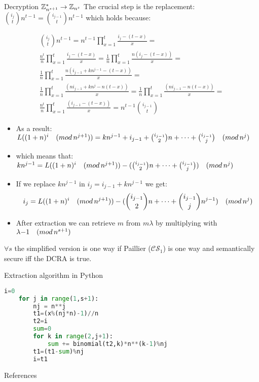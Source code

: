 \documentclass{beamer}
\begin{document}
\begin{frame}[allowframebreaks]{Decryption $\mathbb{Z}_{n^{s+1}}^* \rightarrow \mathbb{Z}_{n^s}$}
The crucial step is the replacement: ${i_j \choose t} n^{t-1} = {i_{j-1} \choose t} n^{t-1}$ which holds because:

\framebreak

\begin{align*}
{i_j \choose t} n^{t-1} = n^{t-1} \prod_{x=1}^{t} \frac{i_j-(t-x)}{x} = \\
\frac{n^t}{n} \prod_{x=1}^{t} \frac{i_j-(t-x)}{x} = \frac{1}{n} \prod_{x=1}^{t} \frac{n(i_j-(t-x))}{x} = \\
\frac{1}{n} \prod_{x=1}^{t} \frac{n(i_{j-1}+kn^{j-1}-(t-x))}{x} = \\
\frac{1}{n} \prod_{x=1}^{t} \frac{(ni_{j-1}+kn^{j}-n(t-x))}{x} = \frac{1}{n} \prod_{x=1}^{t} \frac{(ni_{j-1}-n(t-x))}{x} =\\
\frac{n^t}{n} \prod_{x=1}^{t} \frac{(i_{j-1}-(t-x))}{x} = n^{t-1} {i_{j-1} \choose t}
\end{align*}

\framebreak

\begin{itemize}
\item As a result: $L((1+n)^{i} \quad (mod \, {n^{j+1}})) =   kn^{j-1} + i_{j-1} + { i_{j-1} \choose 2}n + \cdots + { i_{j-1} \choose {j}} \quad (mod \, {n^j}) $ 
\item which means that:$kn^{j-1} = L((1+n)^{i} \quad (mod \, {n^{j+1}})) - ({ i_{j-1} \choose 2}n + \cdots + { i_{j-1} \choose {j}})  \quad (mod \, {n^j})$
\item If we replace $kn^{j-1}$ in  $i_j = i_{j-1} + kn^{j-1}$ we get:
\begin{align*}
i_j = L((1+n)^{i} \quad (mod \, {n^{j+1}})) - ({i_{j-1} \choose 2}n + \cdots + {i_{j-1} \choose j}n^{j-1} )\quad (mod \, {n^j})
\end{align*}
\item After extraction we can retrieve $m$ from $m\lambda$ by multiplying with $\lambda{-1} \quad (mod \, {n^{s+1}})$
\end{itemize}

\begin{theorem}
$\forall s$ the simplified version is one way if Paillier ($\mathcal{CS}_1$) is one way and semantically secure iff the DCRA is true.
\end{theorem}

\end{frame} 

\begin{frame}[fragile]{Extraction algorithm in Python}
\begin{lstlisting}[language=python]
    i=0
    for j in range(1,s+1):
        nj = n**j
        t1=(x%(nj*n)-1)//n
        t2=i
        sum=0
        for k in range(2,j+1):
            sum += binomial(t2,k)*n**(k-1)%nj
        t1=(t1-sum)%nj
        i=t1
\end{lstlisting}
 
\end{frame}

\begin{frame}[allowframebreaks]{References}
\begin{small}
\nocite{*}


\end{small}
\end{frame}
\end{document}
